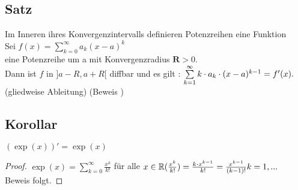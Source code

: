 \subsection[Satz: Potenzreihen und diverenzierbarkeit]{Satz}
Im Inneren ihres Konvergenzintervalls definieren Potenzreihen eine Funktion\\
Sei $f(x) = \sum\limits_{k = 0}^{\infty} a_k (x-a)^k$\\
eine Potenzreihe um a mit Konvergenzradius $\mathbf{R} > 0.$\\
Dann ist $f$ in $]a-R, a+R[$ diffbar und es gilt : $\sum\limits_{k =1}^{\infty} k \cdot a_k \cdot (x-a)^{k-1} = f'(x).$\\
\hfil (gliedweise Ableitung)\newline
\hfil (Beweis \cite{k7})
\subsection{Korollar}\label{sec:6.11}
$(\exp(x))' = \exp(x)$
\begin{proof}
$\exp(x) = \sum\limits_{k = 0}^{\infty} \frac{x^k}{k!}$ für alle $x \in \mathbb{R} \\
(\frac{x^k}{k!}) = \frac{k \cdot x^{k-1}}{k!} = \frac{x^{k-1}}{(k-1)!}\\
k = 1, ...$\\
Beweis folgt.
\end{proof}
